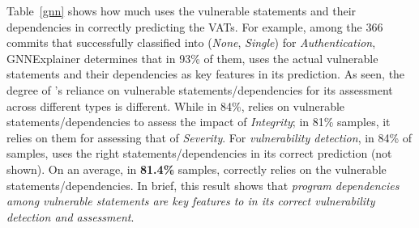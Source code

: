 %



Table~\ref{gnn} shows how much {\tool} uses the vulnerable
statements and their dependencies in correctly predicting the
VATs. For example, among the 366 commits that {\tool} successfully
classified into ({\em None}, {\em Single}) for {\em Authentication},
GNNExplainer determines that in 93\% of them, {\tool}
uses the actual vulnerable statements and their dependencies as key
features in its prediction.
As seen, the degree of {\tool}'s
reliance on vulnerable statements/dependencies for its assessment
across different types
is different.  While in 84\%, {\tool} relies on vulnerable
statements/dependencies to assess the impact of {\em Integrity}; in
81\% samples, it relies on them for assessing that of {\em Severity}.
For {\em vulnerability detection}, in 84\% of samples, {\tool} uses
the right statements/dependencies in its correct prediction (not
shown).
%
On an average, in {\bf 81.4\%} samples, {\tool} correctly
relies on the vulnerable statements/dependencies.
In brief, this result shows that {\em program dependencies among
vulnerable statements are key features to {\tool} in its correct
vulnerability detection and assessment}.



